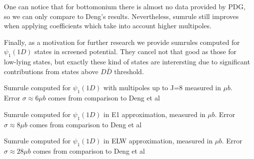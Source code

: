 One can notice that for bottomonium there is almost no data provided by PDG, so we can only compare to Deng's results. Nevertheless, sumrule still improves when applying coefficients which take into account higher multipoles.

Finally, as a motivation for further research we provide sumrules computed for $\psi_1(1D)$ states in screened potential. They cancel not that good as those for low-lying states, but exactly these kind of states are interersting due to significant contributions from states above $D\bar{D}$ threshold.

\begin{table}[H]
    {\caption{Sumrule computed for $\psi_1(1D)$ with multipoles up to J=8 measured in $\mu b$. Error $\sigma \approx 6 \mu b$ comes from comparison to Deng et al \label{tab:sr.psi_1_1D.c-scr}}}
    
\end{table}

\begin{table}[H]
    {\caption{Sumrule computed for $\psi_1(1D)$ in E1 approximation, measured in $\mu b$. Error $\sigma \approx 8 \mu b$ comes from comparison to Deng et al \label{tab:srE1.psi_1_1D.c-scr}}}
    
\end{table}

\begin{table}[H]
    {\caption{Sumrule computed for $\psi_1(1D)$ in ELW approximation, measured in $\mu b$. Error $\sigma \approx 28 \mu b$ comes from comparison to Deng et al \label{tab:srELW.psi_1_1D.c-scr}}}
    
\end{table}
